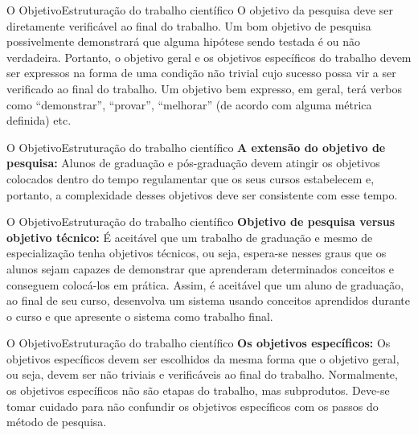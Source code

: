 \documentclass[t]{beamer}
\begin{document}

\begin{ftst}{O Objetivo}{Estruturação do trabalho científico}
\justifying
O objetivo da pesquisa deve ser diretamente verificável ao final do trabalho. Um bom objetivo de pesquisa possivelmente demonstrará que alguma hipótese sendo testada é ou não verdadeira.
\vone
Portanto, o objetivo geral e os objetivos específicos do trabalho devem ser expressos na forma de uma condição não trivial cujo sucesso possa vir a ser verificado ao final do trabalho. Um objetivo bem expresso, em geral, terá verbos como “demonstrar”, “provar”, “melhorar” (de acordo com alguma métrica definida) etc.


\end{ftst}


\begin{ftst}{O Objetivo}{Estruturação do trabalho científico}
\justifying
\textbf{A extensão do objetivo de pesquisa:}
\vone
Alunos de graduação e pós-graduação devem atingir os objetivos colocados dentro do tempo regulamentar que os seus cursos estabelecem e, portanto, a complexidade desses objetivos deve ser consistente com esse tempo.
\end{ftst}


\begin{ftst}{O Objetivo}{Estruturação do trabalho científico}
\justifying
\textbf{Objetivo de pesquisa versus objetivo técnico:}
\vone
É aceitável que um trabalho de graduação e mesmo de especialização tenha objetivos técnicos, ou seja, espera-se nesses graus que os alunos sejam capazes de demonstrar que aprenderam determinados conceitos e conseguem colocá-los em prática. 
\vone
Assim, é aceitável que um aluno de graduação, ao final de seu curso, desenvolva um sistema usando conceitos aprendidos durante o curso e que apresente o sistema como trabalho final. 

\end{ftst}


\begin{ftst}{O Objetivo}{Estruturação do trabalho científico}
\justifying
\textbf{Os objetivos específicos:}
\vone
Os objetivos específicos devem ser escolhidos da mesma forma que o objetivo geral, ou seja, devem ser não triviais e verificáveis ao final do trabalho. Normalmente, os objetivos específicos não são etapas do trabalho, mas subprodutos. 
\vone
Deve-se tomar cuidado para não confundir os objetivos específicos com os passos do método de pesquisa. 

\end{ftst}
\end{document}
